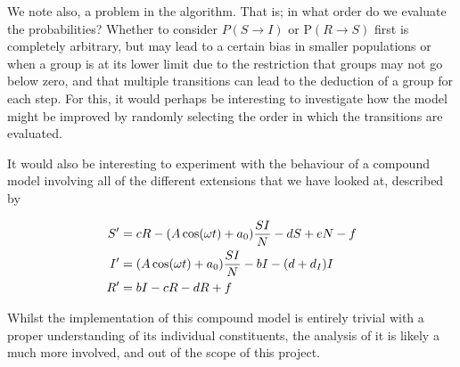 \documentclass[10pt,showpacs,preprintnumbers,amsmath,amssymb,nofootinbib,aps,prl,twocolumn,groupedaddress,superscriptaddress,showkeys]{revtex4-1}
\begin{document}
  We note also, a problem in the algorithm. That is; in what order do we evaluate the probabilities?
  Whether to consider $P(S\rightarrow I)$ or P$(R\rightarrow S)$ first is completely arbitrary, but may lead to a certain bias in smaller populations or when a group is at its lower limit due to the restriction that groups may not go below zero, and that multiple transitions can lead to the deduction of a group for each step. For this, it would perhaps be interesting to investigate how the model might be improved by randomly selecting the order in which the transitions are evaluated.

  It would also be interesting to experiment with the behaviour of a compound model involving all of the different extensions that we have looked at, described by

  \begin{align}
     \begin{split}
        S' &= cR - \qty(A\cos(\omega t) + a_0)\frac{SI}{N} - dS + eN - f \\
        I' &= \qty(A\cos(\omega t)+a_0)\frac{SI}{N} - bI  - (d + d_I)I \\
        R' &= bI - cR - dR + f
     \end{split}
  \end{align} 

   Whilst the implementation of this compound model is entirely trivial with a proper understanding of its individual constituents, the analysis of it is likely a much more involved, and out of the scope of this project.



\end{document}
